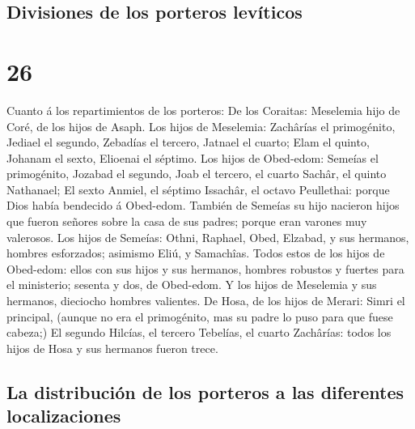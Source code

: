 \hypertarget{divisiones-de-los-porteros-levuxedticos}{%
\subsection{Divisiones de los porteros
levíticos}\label{divisiones-de-los-porteros-levuxedticos}}

\hypertarget{section-25}{%
\section{26}\label{section-25}}

 Cuanto á los repartimientos de los porteros: De los
Coraitas: Meselemia hijo de Coré, de los hijos de Asaph. 
Los hijos de Meselemia: Zachârías el primogénito, Jediael el segundo,
Zebadías el tercero, Jatnael el cuarto;  Elam el quinto,
Johanam el sexto, Elioenai el séptimo.  Los hijos de
Obed-edom: Semeías el primogénito, Jozabad el segundo, Joab el tercero,
el cuarto Sachâr, el quinto Nathanael;  El sexto Anmiel, el
séptimo Issachâr, el octavo Peullethai: porque Dios había bendecido á
Obed-edom.  También de Semeías su hijo nacieron hijos que
fueron señores sobre la casa de sus padres; porque eran varones muy
valerosos.  Los hijos de Semeías: Othni, Raphael, Obed,
Elzabad, y sus hermanos, hombres esforzados; asimismo Eliú, y Samachîas.
 Todos estos de los hijos de Obed-edom: ellos con sus hijos
y sus hermanos, hombres robustos y fuertes para el ministerio; sesenta y
dos, de Obed-edom.  Y los hijos de Meselemia y sus hermanos,
dieciocho hombres valientes.  De Hosa, de los hijos de
Merari: Simri el principal, (aunque no era el primogénito, mas su padre
lo puso para que fuese cabeza;)  El segundo Hilcías, el
tercero Tebelías, el cuarto Zachârías: todos los hijos de Hosa y sus
hermanos fueron trece.

\hypertarget{la-distribuciuxf3n-de-los-porteros-a-las-diferentes-localizaciones}{%
\subsection{La distribución de los porteros a las diferentes
localizaciones}\label{la-distribuciuxf3n-de-los-porteros-a-las-diferentes-localizaciones}}

